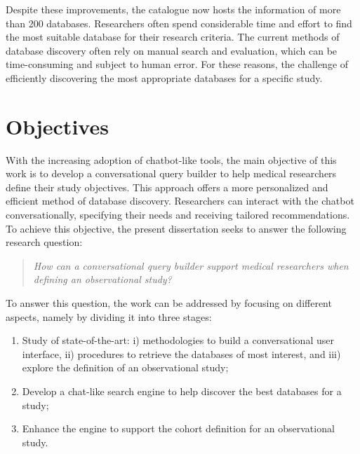 Despite these improvements, the catalogue now hosts the information of more than 200 databases. Researchers often spend considerable time and effort to find the most suitable database for their research criteria. The current methods of database discovery often rely on manual search and evaluation, which can be time-consuming and subject to human error. For these reasons, the challenge of efficiently discovering the most appropriate databases for a specific study. 



\section{Objectives}
\label{objectives}

With the increasing adoption of chatbot-like tools, the main objective of this work is to develop a conversational query builder to help medical researchers define their study objectives. This approach offers a more personalized and efficient method of database discovery. Researchers can interact with the chatbot conversationally, specifying their needs and receiving tailored recommendations. To achieve this objective, the present dissertation seeks to answer the following research question:

\begin{quote}
    \small\textit{How can a conversational query builder support medical researchers when defining an observational study?}
\end{quote}

To answer this question, the work can be addressed by focusing on different aspects, namely by dividing it into three stages:

\begin{enumerate}
    \item Study of state-of-the-art: i) methodologies to build a conversational user interface, ii) procedures to retrieve the databases of most interest, and iii) explore the definition of an observational study;
    \item Develop a chat-like search engine to help discover the best databases for a study;
    \item Enhance the engine to support the cohort definition for an observational study. 
\end{enumerate}


